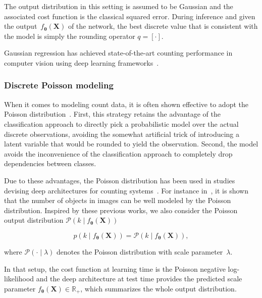 The output distribution in this setting is assumed to be Gaussian and the associated cost function is the classical squared error.
During inference and given the output~$f_{\mathbf{\mathbf{\theta}}}\left(\mathbf{X}\right)$ of the network, the best discrete value that is consistent with the model is simply the rounding operator $q = \left[\cdot\right]$.

Gaussian regression has achieved state-of-the-art counting performance in computer vision using deep learning frameworks~\cite{zhang15, marsden16, boominathan16}.

\subsubsection{Discrete Poisson modeling}
When it comes to modeling count data, it is often shown effective to adopt the Poisson distribution~\cite{fallah09}.
First, this strategy retains the advantage of the classification approach to directly pick a probabilistic model over the actual discrete observations, avoiding the somewhat artificial trick of introducing a latent variable that would be rounded to yield the observation.
Second, the model avoids the inconvenience of the classification approach to completely drop dependencies between classes.

Due to these advantages, the Poisson distribution has been used in studies devising deep architectures for counting systems~\cite{Rezatofigh16}.
For instance in~\cite{fallah09, chan09, Rezatofigh16}, it is shown that the number of objects in images can be well modeled by the Poisson distribution. Inspired by these previous works, we also consider the Poisson output distribution \(\mathcal{P}\left(k\mid f_{\mathbf{\mathbf{\theta}}}\left(\mathbf{X}\right)\right)\)

\begin{equation}
p \left(k\mid f_{\mathbf{\theta}}\left(\mathbf{X}\right)\right)=\mathcal{P}\left(k\mid f_{\mathbf{\mathbf{\theta}}}\left(\mathbf{X}\right)\right),
\end{equation}

where $\mathcal{P}\left(\cdot\mid\lambda\right)$ denotes the Poisson distribution with scale parameter~$\lambda$.

In that setup, the cost function at learning time is the Poisson negative log-likelihood and the deep architecture at test time provides the predicted scale parameter $f_{\mathbf{\mathbf{\theta}}}\left(\mathbf{X}\right)\in\mathbb{R}_+$, which summarizes the whole output distribution.

